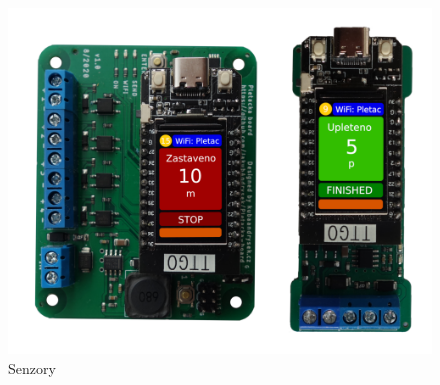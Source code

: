 \begin{figure}[htbp]
    \centering
    \includegraphics[width=\textwidth]{img/Oba.png}
    \caption{Senzory}
    \label{fig:senzory}
\end{figure}


\newpage